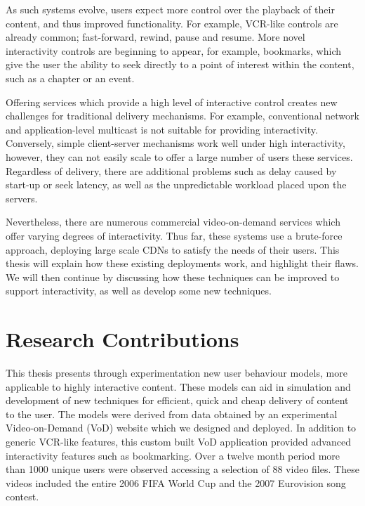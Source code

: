 As such systems evolve, users expect more control over the playback of their content, and thus improved functionality. For example, VCR-like controls are already common; fast-forward, rewind, pause and resume. More novel interactivity controls are beginning to appear, for example, bookmarks, which give the user the ability to seek directly to a point of interest within the content, such as a chapter or an event.

Offering services which provide a high level of interactive control creates new challenges for traditional delivery mechanisms. For example, conventional network and application-level multicast is not suitable for providing interactivity. Conversely, simple client-server mechanisms work well under high interactivity, however, they can not easily scale to offer a large number of users these services. Regardless of delivery, there are additional problems such as delay caused by start-up or seek latency, as well as the unpredictable workload placed upon the servers.

Nevertheless, there are numerous commercial video-on-demand services which offer varying degrees of interactivity. Thus far, these systems use a brute-force approach, deploying large scale CDNs to satisfy the needs of their users. This thesis will explain how these existing deployments work, and highlight their flaws. We will then continue by discussing how these techniques can be improved to support interactivity, as well as develop some new techniques.

\section{Research Contributions}


This thesis presents through experimentation new user behaviour models, more applicable to highly interactive content. These models can aid in simulation and development of new techniques for efficient, quick and cheap delivery of content to the user. The models were derived from data obtained by an experimental Video-on-Demand (VoD) website which we designed and deployed. In addition to generic VCR-like features, this custom built VoD application provided advanced interactivity features such as bookmarking. Over a twelve month period more than 1000 unique users were observed accessing a selection of 88 video files. These videos included the entire 2006 FIFA World Cup and the 2007 Eurovision song contest.

